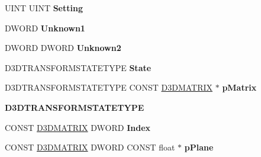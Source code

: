 \begin{DoxyCompactItemize}
\item 
\mbox{\label{struct___i_direct3_d_device9_vtbl___i_n_t_ae38e321f900a02fc054fe3ab335858a6}} 
U\+I\+NT U\+I\+NT {\bfseries Setting}
\item 
\mbox{\label{struct___i_direct3_d_device9_vtbl___i_n_t_a323562ec36d77150faac0c66f0ebad71}} 
D\+W\+O\+RD {\bfseries Unknown1}
\item 
\mbox{\label{struct___i_direct3_d_device9_vtbl___i_n_t_ae74cd5ae27b7ae68de0700e9f22a1824}} 
D\+W\+O\+RD D\+W\+O\+RD {\bfseries Unknown2}
\item 
\mbox{\label{struct___i_direct3_d_device9_vtbl___i_n_t_aae89af129491dd4482ae73416e0b990b}} 
D3\+D\+T\+R\+A\+N\+S\+F\+O\+R\+M\+S\+T\+A\+T\+E\+T\+Y\+PE {\bfseries State}
\item 
\mbox{\label{struct___i_direct3_d_device9_vtbl___i_n_t_a3e04170a40ea490d41deb2174f3990cb}} 
D3\+D\+T\+R\+A\+N\+S\+F\+O\+R\+M\+S\+T\+A\+T\+E\+T\+Y\+PE C\+O\+N\+ST \hyperlink{struct___d3_d_m_a_t_r_i_x}{D3\+D\+M\+A\+T\+R\+IX} $\ast$ {\bfseries p\+Matrix}
\item 
\mbox{\label{struct___i_direct3_d_device9_vtbl___i_n_t_a01aaa768b471759ee3460f185d592308}} 
{\bfseries D3\+D\+T\+R\+A\+N\+S\+F\+O\+R\+M\+S\+T\+A\+T\+E\+T\+Y\+PE}
\item 
\mbox{\label{struct___i_direct3_d_device9_vtbl___i_n_t_afd47ce6956a05d5167eefaf5a0b1f81a}} 
C\+O\+N\+ST \hyperlink{struct___d3_d_m_a_t_r_i_x}{D3\+D\+M\+A\+T\+R\+IX} D\+W\+O\+RD {\bfseries Index}
\item 
\mbox{\label{struct___i_direct3_d_device9_vtbl___i_n_t_a4f575f3b0c73cf3f5e4bbcbd1efbd04a}} 
C\+O\+N\+ST \hyperlink{struct___d3_d_m_a_t_r_i_x}{D3\+D\+M\+A\+T\+R\+IX} D\+W\+O\+RD C\+O\+N\+ST float $\ast$ {\bfseries p\+Plane}
\item 
\mbox{\label{struct___i_direct3_d_device9_vtbl___i_n_t_af7e0a97a3582ca02a94b72246e736d9c}} 

\end{DoxyCompactItemize}
